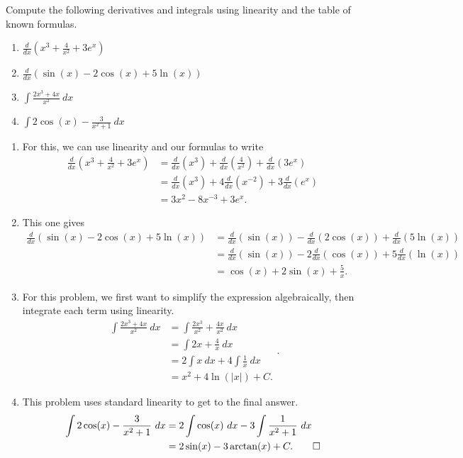 \begin{example}
Compute the following derivatives and integrals using linearity and the table of known formulas.
\begin{enumerate}
\item $\frac{d}{dx}\left(x^3 + \frac{4}{x^2} + 3e^{x} \right)$
\item $\frac{d}{dx}\left( \sin(x) - 2\cos(x) + 5\ln(x) \right)$
\item $\int \frac{2x^3 + 4x}{x^2}\ dx$
\item $\int 2\cos(x) - \frac{3}{x^2 + 1}\ dx$
\end{enumerate}
\end{example}
\begin{exampleSol}
\begin{enumerate}
\item For this, we can use linearity and our formulas to write
\[ \begin{split}
\frac{d}{dx}\left(x^3 + \frac{4}{x^2} + 3e^{x} \right) &= \frac{d}{dx}\left( x^3 \right) + \frac{d}{dx}\left(\frac{4}{x^2} \right) + \frac{d}{dx}\left(3e^x \right) \\
&= \frac{d}{dx}\left( x^3\right) + 4\frac{d}{dx}\left( x^{-2}\right) + 3\frac{d}{dx}\left( e^x\right) \\
&= 3x^2 - 8x^{-3} + 3e^x.
\end{split} \]
\item This one gives
\[ \begin{split}
\frac{d}{dx}\left( \sin(x) - 2\cos(x) + 5\ln(x) \right) &= \frac{d}{dx}\left( \sin(x)\right) - \frac{d}{dx}\left(2 \cos(x) \right) + \frac{d}{dx}\left( 5\ln(x)\right) \\ 
&= \frac{d}{dx}\left( \sin(x)\right) - 2\frac{d}{dx}\left(\cos(x) \right) + 5\frac{d}{dx}\left( \ln(x)\right) \\
&= \cos(x) + 2\sin(x) + \frac{5}{x}.
\end{split} \]
\item For this problem, we first want to simplify the expression algebraically, then integrate each term using linearity.
\[ \begin{split}
\int \frac{2x^3 + 4x}{x^2}\ dx &= \int \frac{2x^3}{x^2} + \frac{4x}{x^2}\ dx \\
&= \int 2x + \frac{4}{x}\ dx \\
&= 2\int x\ dx + 4\int \frac{1}{x}\ dx \\
&= x^2 + 4\ln(|x|) + C.
\end{split}. \]
\item This problem uses standard linearity to get to the final answer.
\[ \begin{split}
\int 2\cos(x) - \frac{3}{x^2 + 1}\ dx &= 2 \int \cos(x)\ dx - 3 \int \frac{1}{x^2 + 1}\ dx \\
&= 2 \sin(x) - 3\arctan(x) + C. \qedhere
\end{split} \]
\end{enumerate}
\end{exampleSol}

